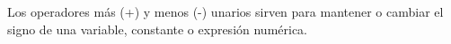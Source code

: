 Los operadores más (+) y menos (-) unarios sirven para mantener o cambiar el signo de una
variable, constante o expresión numérica.